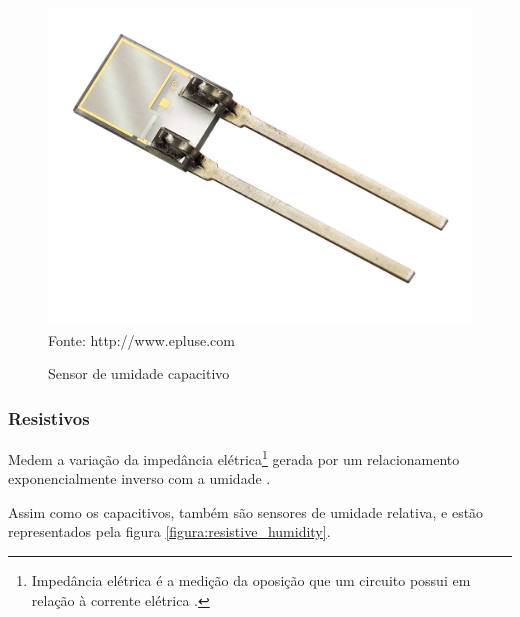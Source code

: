 \begin{figure}[h]
	\caption{Sensor de umidade capacitivo}
	\centering
	\includegraphics[scale=0.18]{../images/capacitive-humidity.jpg}
	\hspace{\linewidth}
	Fonte: http://www.epluse.com
	\label{figura:capacitive_humidity}
\end{figure}

\subsubsection{Resistivos}
Medem a variação da impedância elétrica\footnote{Impedância elétrica é a medição da oposição que um circuito
possui em relação à corrente elétrica \cite{britannica_2015}.} gerada por um relacionamento exponencialmente
inverso com a umidade \cite{fontesII2005}.

Assim como os capacitivos, também são sensores de umidade relativa, e estão representados pela figura
\ref{figura:resistive_humidity}.

